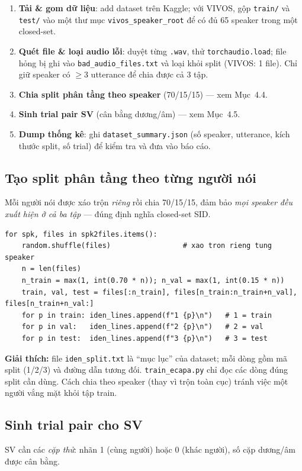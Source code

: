 \documentclass[12pt,a4paper]{article}
\begin{document}
\begin{enumerate}
  \item \textbf{Tải \& gom dữ liệu}: add dataset trên Kaggle; với VIVOS, gộp
  \texttt{train/} và \texttt{test/} vào một thư mục \texttt{vivos\_speaker\_root}
  để có đủ 65 speaker trong một closed-set.
  \item \textbf{Quét file \& loại audio lỗi}: duyệt từng \texttt{.wav}, thử
  \texttt{torchaudio.load}; file hỏng bị ghi vào \texttt{bad\_audio\_files.txt} và
  loại khỏi split (VIVOS: 1 file). Chỉ giữ speaker có $\ge 3$ utterance để chia
  được cả 3 tập.
  \item \textbf{Chia split phân tầng theo speaker} (70/15/15) --- xem Mục~4.4.
  \item \textbf{Sinh trial pair SV} (cân bằng dương/âm) --- xem Mục~4.5.
  \item \textbf{Dump thống kê}: ghi \texttt{dataset\_summary.json} (số speaker,
  utterance, kích thước split, số trial) để kiểm tra và đưa vào báo cáo.
\end{enumerate}

\subsection{Tạo split phân tầng theo từng người nói}
Mỗi người nói được xáo trộn \emph{riêng} rồi chia 70/15/15, đảm bảo \emph{mọi
speaker đều xuất hiện ở cả ba tập} --- đúng định nghĩa closed-set SID.

\begin{lstlisting}
for spk, files in spk2files.items():
    random.shuffle(files)                 # xao tron rieng tung speaker
    n = len(files)
    n_train = max(1, int(0.70 * n)); n_val = max(1, int(0.15 * n))
    train, val, test = files[:n_train], files[n_train:n_train+n_val], files[n_train+n_val:]
    for p in train: iden_lines.append(f"1 {p}\n")   # 1 = train
    for p in val:   iden_lines.append(f"2 {p}\n")   # 2 = val
    for p in test:  iden_lines.append(f"3 {p}\n")   # 3 = test
\end{lstlisting}

\textbf{Giải thích:} file \texttt{iden\_split.txt} là ``mục lục'' của dataset; mỗi
dòng gồm mã split (1/2/3) và đường dẫn tương đối. \texttt{train\_ecapa.py} chỉ đọc
các dòng đúng split cần dùng. Cách chia theo speaker (thay vì trộn toàn cục) tránh
việc một người vắng mặt khỏi tập train.

\subsection{Sinh trial pair cho SV}
SV cần các \emph{cặp thử}: nhãn 1 (cùng người) hoặc 0 (khác người), số cặp dương/âm
được cân bằng.
\end{document}
